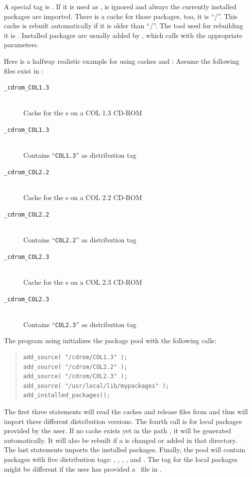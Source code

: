 \documentclass[10pt]{article}
\begin{document}
A special tag is . If it is used as ,
 is ignored and always the currently installed packages are
imported. There is a cache for those packages, too, it is
``\PKGDBVLIBPATH\slash\ICACHEFILENAME''. This cache is rebuilt
automatically if it is older than
``\RPMLIBPATH\slash\RPMDBFILENAME''. The tool used for rebuilding
it is \ICACHEPROG. Installed packages are usually added by
, which calls  with the
appropriate parameters.

Here is a halfway realistic example for using caches and
: Assume the following files exist in \PKGDBVLIBPATH:
\nopagebreak
\begin{description}
\item[\RCACHEPREFIX\texttt{_cdrom_COL1.3}]\ \\
Cache for the s on a COL 1.3 CD-ROM
\item[\RRELEASEPREFIX\texttt{_cdrom_COL1.3}]\ \\
Contains ``\texttt{COL1.3}'' as distribution tag
\item[\RCACHEPREFIX\texttt{_cdrom_COL2.2}]\ \\
Cache for the s on a COL 2.2 CD-ROM
\item[\RRELEASEPREFIX\texttt{_cdrom_COL2.2}]\ \\
Contains ``\texttt{COL2.2}'' as distribution tag
\item[\RCACHEPREFIX\texttt{_cdrom_COL2.3}]\ \\
Cache for the s on a COL 2.3 CD-ROM
\item[\RRELEASEPREFIX\texttt{_cdrom_COL2.3}]\ \\
Contains ``\texttt{COL2.3}'' as distribution tag
\end{description}
The program using  initializes the package pool with
the following calls:
\begin{quote}
\begin{verbatim}
add_source( "/cdrom/COL1.3" );
add_source( "/cdrom/COL2.2" );
add_source( "/cdrom/COL2.3" );
add_source( "/usr/local/lib/mypackages" );
add_installed_packages();
\end{verbatim}
\end{quote}
The first three statements will read the caches and release files from
\PKGDBVLIBPATH and thus will import three different distribution
versions. The fourth call is for local packages provided by the user.
If no cache exists yet in the path ,
it will be generated automatically. It will also be rebuilt if a 
 is changed or added in that directory. The last statements
imports the installed packages. Finally, the pool will contain
packages with five distribution tags: , ,
, , and .
The tag for the local packages might be different if the user has
provided a \RELEASEFILENAME\ file in .
\end{document}
